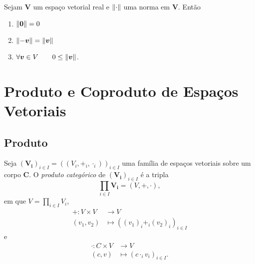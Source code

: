 \begin{prop}
	Sejam $\bm V$ um espaço vetorial real e $\left\Vert{\cdot}\right\Vert$ uma norma em $\bm V$. Então
	\begin{enumerate}
	\item $\left\Vert{\bm 0}\right\Vert = 0$
	\item $\left\Vert{- \bm v}\right\Vert = \left\Vert{\bm v}\right\Vert$
	\item $\forall \bm v \in V \qquad 0 \leq \left\Vert{\bm v}\right\Vert$.
	\end{enumerate}
\end{prop}






























\cleardoublepage
\section{Produto e Coproduto de Espaços Vetoriais}

\subsection{Produto}

\begin{defi}
Seja $(\bm{V_i})_{i \in I} = ((V_i,+_i,\cdot_i))_{i \in I}$ uma família de espaços vetoriais sobre um corpo $\bm C$. O \emph{produto categórico} de $(\bm{V_i})_{i \in I}$ é a tripla
	\begin{equation*}
	\prod_{i \in I} \bm{V_i} = (V,+,\cdot),
	\end{equation*}
em que $V = \prod_{i \in I} V_i$,
	\begin{align*}
	+: V \times V &\to V \\
			(v_1,v_2) &\mapsto ((v_1)_i +_i (v_2)_i)_{i \in I}
	\end{align*}
e
	\begin{align*}
	\cdot: C \times V &\to V \\
			(c,v) &\mapsto (c \cdot_i v_i)_{i \in I}.
	\end{align*}
\end{defi}

